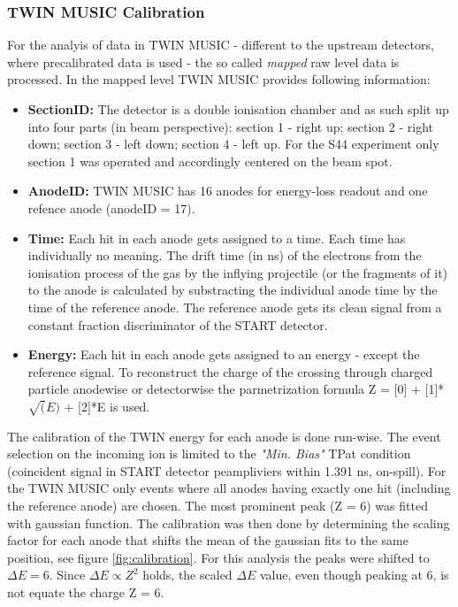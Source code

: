 \subsubsection{TWIN MUSIC Calibration}
For the analyis of data in TWIN MUSIC - different to the upstream detectors, where precalibrated data is used - the so called \textit{mapped} raw level data is processed. In the mapped level TWIN MUSIC provides following information:
\begin{itemize}
\itemsep0em 
\item \textbf{SectionID:} The detector is a double ionisation chamber and as such split up into four parts (in beam perspective): section 1 - right up; section 2 - right down; section 3 - left down; section 4 - left up. For the S44 experiment only section 1 was operated and accordingly centered on the beam spot.
\item \textbf{AnodeID:} TWIN MUSIC has 16 anodes for energy-loss readout and one refence anode (anodeID = 17).
\item \textbf{Time:} Each hit in each anode gets assigned to a time. Each time has individually no meaning. The drift time (in ns) of the electrons from the ionisation process of the gas by the inflying projectile (or the fragments of it) to the anode is calculated by substracting the individual anode time by the time of the reference anode. The reference anode gets its clean signal from a constant fraction discriminator of the START detector.
\item \textbf{Energy:} Each hit in each anode gets assigned to an energy - except the reference signal. To reconstruct the charge of the crossing through charged particle anodewise or detectorwise the parmetrization formula Z = [0] + [1]*$\sqrt(E)$ + [2]*E is used. 
\end{itemize}
The calibration of the TWIN energy for each anode is done run-wise. The event selection on the incoming ion is limited to the  \textit{"Min. Bias"} TPat condition (coincident signal in START detector peampliviers within 1.391 ns, on-spill). For the TWIN MUSIC only events where all anodes having exactly one hit (including the reference anode) are chosen. The most prominent peak (Z = 6) was fitted with gaussian function. The calibration was then done by determining the scaling factor for each anode  that shifts the mean of the gaussian fits to the same position, see figure \ref{fig:calibration}. For this analysis the peaks were shifted to $\Delta E = 6$. Since $\Delta E \propto Z^2$ holds, the scaled $\Delta E$ value, even though peaking at 6, is not equate the charge Z = 6.
